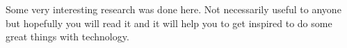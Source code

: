 Some very interesting research was done here. Not necessarily useful to anyone but hopefully you will read it and it will help you to get inspired to do some great things with technology.